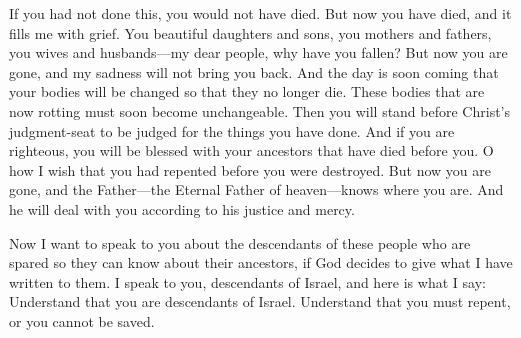 If you had not done this, you would not have died. But now you have died, and it fills me with grief.
\bverse \iffalse O ye fair sons and daughters, ye fathers and mothers, ye husbands and wives, ye fair ones, how is it that ye could have fallen! \fi
You beautiful daughters and sons, you mothers and fathers, you wives and husbands---my dear people, why have you fallen?
\bverse \iffalse But behold, ye are gone, and my sorrows cannot bring your return. \fi
But now you are gone, and my sadness will not bring you back.
\bverse \iffalse And the day soon cometh that your mortal must put on immortality, and these bodies which are now moldering in corruption must soon become incorruptible bodies; and then ye must stand before the judgment-seat of Christ to be judged according to your works and if it so be that ye are righteous, then are ye blessed with your fathers who have gone before you. \fi
And the day is soon coming that your bodies will be changed so that they no longer die. These bodies that are now rotting must soon become unchangeable. Then you will stand before Christ's judgment-seat to be judged for the things you have done. And if you are righteous, you will be blessed with your ancestors that have died before you.
\bverse \iffalse O that ye had repented before this great destruction had come upon you. But behold, ye are gone, and the Father, yea, the Eternal Father of heaven, knoweth your state; and he doeth with you according to his justice and mercy. \fi
O how I wish that you had repented before you were destroyed. But now you are gone, and the Father---the Eternal Father of heaven---knows where you are. And he will deal with you according to his justice and mercy.
\bchapter
\iffalse And now, behold, I would speak somewhat unto the remnant of this people who are spared, if it so be that God may give unto them my words, that they may know of the things of their fathers; yea, I speak unto you, ye remnant of the house of Israel; and these are the words which I speak: \fi
Now I want to speak to you about the descendants of these people who are spared so they can know about their ancestors, if God decides to give what I have written to them. I speak to you, descendants of Israel, and here is what I say:
\bverse \iffalse Know ye that ye are of the house of Israel. \fi
Understand that you are descendants of Israel.
\bverse \iffalse Know ye that ye must come unto repentance, or ye cannot be saved. \fi
Understand that you must repent, or you cannot be saved.
